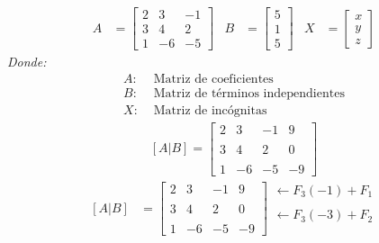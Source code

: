 \documentclass[10pt, a4paper]{article}
\begin{document}
\begin{multicols*}{2}
  \begin{align*}
    A &= \begin{bmatrix}
      2 & 3 & -1\\
      3 & 4 & 2\\
      1 & -6 & -5
    \end{bmatrix}&
    B &= \begin{bmatrix}
      5\\
      1\\
      5
    \end{bmatrix}&
    X &= \begin{bmatrix}
      x\\
      y\\
      z
    \end{bmatrix}
  \end{align*}
  \textit{Donde:}
  \begin{align*}
    A: &\text{ Matriz de coeficientes}\\
    B: &\text{ Matriz de términos independientes}\\
    X: &\text{ Matriz de incógnitas}
  \end{align*}
  \begin{align*}
    \left[A|B\right] = \left[
      \begin{array}{ccc|c}
        2 & 3 & -1 & 9 \\\\
        3 & 4 & 2 & 0 \\\\
        1 & -6 & -5 & -9 
      \end{array}
    \right]
\end{align*}
    \begin{align*}
    \left[A|B\right]&=\left[
      \begin{array}{ccc|c}
        2 & 3 & -1 & 9 \\\\
        3 & 4 & 2 & 0 \\\\
        1 & -6 & -5 & -9
      \end{array}
    \right]
    \begin{array}{r}
      \leftarrow F_3\left(-1\right)+F_1 \\\\
      \leftarrow F_3\left(-3\right)+F_2 \\\\

\end{array}
\end{align*}
\end{multicols*}
\end{document}
